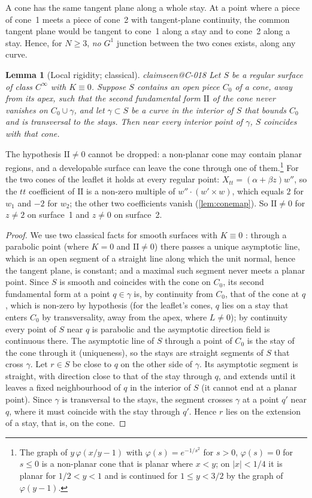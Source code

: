 \documentclass[11pt,a4paper]{article}
\makeatletter
\theoremstyle{plain}
\newtheorem{lemma}[theorem]{Lemma}
\theoremstyle{remark}
\newcommand{\claim}[1]{\ifcsname claimseen@#1\endcsname\else\expandafter\gdef\csname claimseen@#1\endcsname{}\label{claim:#1}\fi}
\makeatother
\begin{document}
A cone has the same tangent plane along a whole stay. At a point where a piece of cone~1 meets a piece of cone~2 with
tangent-plane continuity, the common tangent plane would be tangent to cone~1 along a stay and to cone~2 along a stay.
Hence, for $N\ge3$, \emph{no} $G^1$ junction between the two cones exists, along any curve.

\begin{lemma}[Local rigidity; classical]\label{lem:rigid}\claim{C-018}
Let $S$ be a regular surface of class $C^\infty$ with $K\equiv0$. Suppose $S$ contains an open piece $C_0$ of a cone, away
from its apex, such that the second fundamental form $\mathrm{II}$ of the cone never vanishes on $C_0\cup\gamma$, and let
$\gamma\subset S$ be a curve in the interior of $S$ that bounds $C_0$ and is transversal to the stays. Then near every
interior point of $\gamma$, $S$ coincides with that cone.
\end{lemma}
The hypothesis $\mathrm{II}\ne0$ cannot be dropped: a non-planar cone may contain planar regions, and a developable surface
can leave the cone through one of them.\footnote{The graph of $y\,\varphi(x/y-1)$ with $\varphi(s)=e^{-1/s^2}$ for $s>0$,
$\varphi(s)=0$ for $s\le0$ is a non-planar cone that is planar where $x<y$; on $|x|<1/4$ it is planar for $1/2<y<1$ and is
continued for $1\le y<3/2$ by the graph of $\varphi(y-1)$.} For the two cones of the leaflet it holds at every regular
point: $X_{tt}=(\alpha+\beta z)w''$, so the $tt$ coefficient of $\mathrm{II}$ is a non-zero multiple of
$w''\cdot(w'\times w)$, which equals $2$ for $w_1$ and $-2$ for $w_2$; the other two coefficients vanish
(\cref{lem:conemap}). So $\mathrm{II}\ne0$ for $z\ne2$ on surface~1 and $z\ne0$ on surface~2.
\begin{proof}
We use two classical facts for smooth surfaces with $K\equiv0$ \citep[\S5-8, Propositions~1 and~2, due to
Massey]{doCarmo1976}: through a parabolic point (where $K=0$ and $\mathrm{II}\ne0$) there passes a unique asymptotic line,
which is an open segment of a straight line along which the unit normal, hence the tangent plane, is constant; and a
maximal such segment never meets a planar point. Since $S$ is smooth and coincides with the cone on $C_0$, its second
fundamental form at a point $q\in\gamma$ is, by continuity from $C_0$, that of the cone at $q$, which is non-zero by
hypothesis (for the leaflet's cones, $q$ lies on a stay that enters $C_0$ by transversality, away from the apex, where
$L\ne0$); by continuity every point of $S$ near $q$ is parabolic and the asymptotic direction field is continuous there.
The asymptotic line of $S$ through a point of $C_0$ is the stay of the cone through it (uniqueness), so the stays are
straight segments of $S$ that cross $\gamma$. Let $r\in S$ be close to $q$ on the other side of $\gamma$. Its asymptotic
segment is straight, with direction close to that of the stay through $q$, and extends until it leaves a fixed
neighbourhood of $q$ in the interior of $S$ (it cannot end at a planar point). Since $\gamma$ is transversal to the stays,
the segment crosses $\gamma$ at a point $q'$ near $q$, where it must coincide with the stay through $q'$. Hence $r$ lies
on the extension of a stay, that is, on the cone.
\end{proof}
\end{document}
